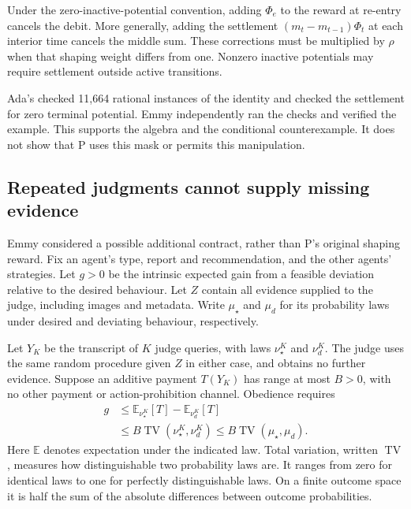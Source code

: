 \documentclass[11pt]{article}
\begin{document}
Under the zero-inactive-potential convention, adding \(\Phi_e\) to the reward at re-entry cancels the debit.
More generally, adding the settlement \((m_t-m_{t-1})\Phi_t\) at each interior time cancels the middle sum.
These corrections must be multiplied by \(\rho\) when that shaping weight differs from one. Nonzero inactive
potentials may require settlement outside active transitions.

Ada's  checked 11,664 rational instances of the identity and checked the
settlement for zero terminal potential. Emmy independently ran the checks and verified the example. This
supports the algebra and the conditional counterexample. It does not show that P uses this mask or permits
this manipulation.

\subsection{Repeated judgments cannot supply missing evidence}

Emmy considered a possible additional contract, rather than P's original shaping reward. Fix an agent's type,
report and recommendation, and the other agents' strategies. Let \(g>0\) be the intrinsic expected gain from a
feasible deviation relative to the desired behaviour. Let \(Z\) contain all evidence supplied to the judge,
including images and metadata. Write \(\mu_\star\) and \(\mu_d\) for its probability laws under desired and
deviating behaviour, respectively.

Let \(Y_K\) be the transcript of \(K\) judge queries, with laws \(\nu_\star^K\) and \(\nu_d^K\). The judge
uses the same random procedure given \(Z\) in either case, and obtains no further evidence. Suppose an
additive payment \(T(Y_K)\) has range at most \(B>0\), with no other payment or action-prohibition channel.
Obedience requires
\[
\begin{aligned}
g&\leq \mathbb{E}_{\nu_\star^K}[T]-\mathbb{E}_{\nu_d^K}[T]\\
 &\leq B\operatorname{TV}(\nu_\star^K,\nu_d^K)
 \leq B\operatorname{TV}(\mu_\star,\mu_d).
\end{aligned}
\]
Here \(\mathbb{E}\) denotes expectation under the indicated law. Total variation, written
\(\operatorname{TV}\), measures how distinguishable two probability laws are. It ranges from zero for
identical laws to one for perfectly distinguishable laws. On a finite outcome space it is half the sum of the
absolute differences between outcome probabilities.
\end{document}
